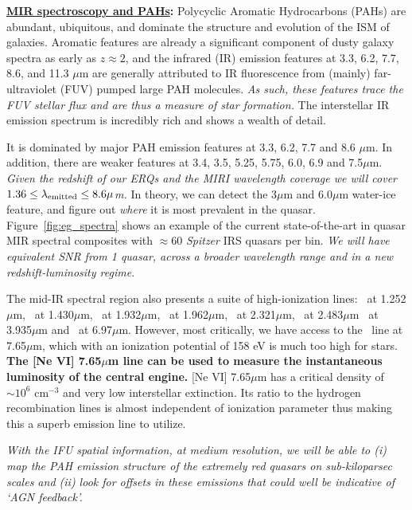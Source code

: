 \smallskip
\smallskip
\noindent
{\bf \underline{MIR spectroscopy and PAHs}:}
Polycyclic Aromatic Hydrocarbons (PAHs) are abundant, ubiquitous, and
dominate the structure and evolution of the ISM of galaxies.  Aromatic
features are already a significant component of dusty galaxy spectra
as early as $z\approx2$, and the infrared (IR) emission features at
3.3, 6.2, 7.7, 8.6, and 11.3 $\mu$m are generally attributed to IR
fluorescence from (mainly) far-ultraviolet (FUV) pumped large PAH
molecules. {\it As such, these features trace the FUV stellar flux and
are thus a measure of star formation.} The interstellar IR emission
spectrum is incredibly rich and shows a wealth of detail. {It is
dominated by major PAH emission features at 3.3, 6.2, 7.7 and 8.6
$\mu$m.  In addition, there are weaker features at 3.4, 3.5, 5.25,
5.75, 6.0, 6.9 and 7.5$\mu$m. {\it Given the redshift of our ERQs and
the MIRI wavelength coverage we will cover $1.36 \leq \lambda_{\rm
emitted} \leq 8.6 \mu$m.}  In theory, we can detect the 3$\mu$m and
6.0$\mu$m water-ice feature, and figure out {\it where} it is most
prevalent in the quasar. Figure~\ref{fig:eg_spectra} shows an example
of the current state-of-the-art in quasar MIR spectral composites with
$\approx$60 {\it Spitzer} IRS quasars per bin.  {\it We will have
equivalent SNR from 1 quasar, across a broader wavelength range and in
a new redshift-luminosity regime.}

\smallskip
\smallskip
\noindent
The mid-IR spectral region also presents a suite of high-ionization
lines: \snine\ at 1.252$\mu$m, \six\ at 1.430$\mu$m, \sixi\ at
1.932$\mu$m, \sivi\ at 1.962$\mu$m, \caviii\ at 2.321$\mu$m, \sivi\ at
2.483$\mu$m \siix\ at 3.935$\mu$m and \arii\ at 6.97$\mu$m.  However,
most critically, we have access to the \nevi\ line at 7.65$\mu$m,
which with an ionization potential of 158 eV is much too high for
stars.  {\bf The [Ne VI] 7.65$\mu$m line can be used to measure the
instantaneous luminosity of the central engine.}  [Ne VI] 7.65$\mu$m
has a critical density of $\sim10^{6}$ cm$^{-3}$ and very low
interstellar extinction.  Its ratio to the hydrogen recombination
lines is almost independent of ionization parameter thus making this a
superb emission line to utilize.

\smallskip
\smallskip
\noindent
{\it With the IFU spatial information, at medium resolution, we will
be able to (i) map the PAH emission structure of the extremely red
quasars on sub-kiloparsec scales and (ii) look for offsets in these
emissions that could well be indicative of `AGN feedback'.}

}
